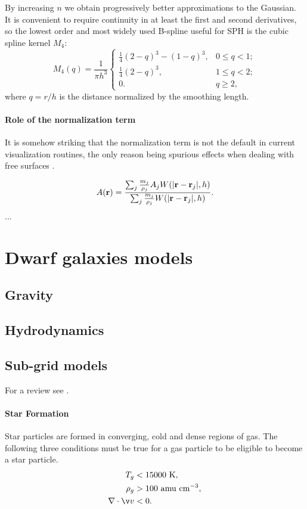 By increasing $n$ we obtain progressively better approximations to the Gaussian. It is convenient to require continuity in at least the first and second derivatives, so the lowest order and most widely used B-spline useful for SPH is the cubic spline kernel $M_4$:
\begin{equation}
M_4(q) = \frac{1}{\pi h^3} \left\{
\begin{array}{ll}
\frac{1}{4}(2-q)^3 - (1 - q)^{3}, & 0 \le q < 1; \\
\frac{1}{4}(2-q)^3, & 1 \le q < 2; \\
0. & q \ge 2,
\end{array}
\right.
\label{eq:cubicspline}
\end{equation}
where $q=r/h$ is the distance normalized by the smoothing length.

\paragraph{Role of the normalization term}
It is somehow striking that the normalization term is not the default in current visualization routines, the only reason being spurious effects when dealing with free surfaces \citep{Price2007}.

\begin{equation}
 A(\boldsymbol{\mathbf{r}}) = \dfrac{\sum_j \frac{m_j}{\rho_j} A_j W(|\boldsymbol{\mathbf{r}} - \boldsymbol{\mathbf{r}}_j|,h)}{\sum_j \frac{m_j}{\rho_j} W(|\boldsymbol{\mathbf{r}} - \boldsymbol{\mathbf{r}}_j|,h)}.
\end{equation}
...

\section{Dwarf galaxies models}
\citet{Verbeke2017}
\subsection{Gravity}
\subsection{Hydrodynamics}
\subsection{Sub-grid models}
For a review see \citet{Verbeke2017, Vandenbroucke2016}.

\paragraph{Star Formation}
Star particles are formed in converging, cold and dense regions of gas.
The following three conditions must be true for a gas particle to be eligible to become a star particle.
\begin{align*}
 T_g &< 15000 \text{~K},\\
 \rho_g &> 100 \text{~amu~cm}^{-3},\\
 \nabla \cdot \v v & < 0.
\end{align*}

